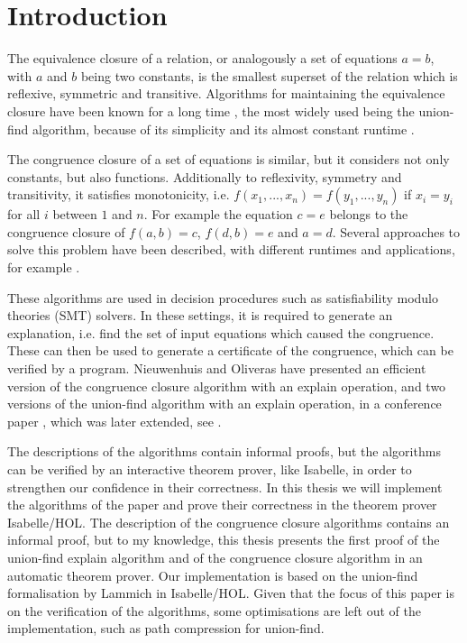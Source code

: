 
\chapter{Introduction}\label{chapter:introduction}

The equivalence closure of a relation, or analogously a set of equations $a = b$, with $a$ and $b$ being two constants, is the smallest superset of the relation which is reflexive, symmetric and transitive. Algorithms for maintaining the equivalence closure have been known for a long time \cite{unionfind-og}, the most widely used being the union-find algorithm, because of its simplicity and its almost constant runtime \cite{Tarjan}.

The congruence closure of a set of equations is similar, but it considers not only constants, but also functions. Additionally to reflexivity, symmetry and transitivity, it satisfies monotonicity, i.e. $f(x_1, ... ,x_n) = f(y_1, ... ,y_n)$ if $x_i = y_i$ for all $i$ between $1$ and $n$. \cite{Nieuwenhuis} For example the equation $c = e$ belongs to the congruence closure of $f(a,b) = c$, $f(d,b) = e$ and $a = d$. Several approaches to solve this problem have been described, with different runtimes and applications, for example \cite{congruenceclosure-og2,congruenceclosure-og,Nieuwenhuis}.

These algorithms are used in decision procedures such as satisfiability modulo theories (SMT) solvers. \cite{z3} In these settings, it is required to generate an explanation, i.e. find the set of input equations which caused the congruence. These can then be used to generate a certificate of the congruence, which can be verified by a program. Nieuwenhuis and Oliveras have presented an efficient version of the congruence closure algorithm with an explain operation, and two versions of the union-find algorithm with an explain operation, in a conference paper \cite{Nieuwenhuis}, which was later extended, see \cite{Nieuwenhuis2}.

The descriptions of the algorithms contain informal proofs, but the algorithms can be verified by an interactive theorem prover, like Isabelle, in order to strengthen our confidence in their correctness. In this thesis we will implement the algorithms of the paper \cite{Nieuwenhuis} and prove their correctness in the theorem prover Isabelle/HOL.  The description of the congruence closure algorithms contains an informal proof, but to my knowledge, this thesis presents the first proof of the union-find explain algorithm and of the congruence closure algorithm in an automatic theorem prover. Our implementation is based on the union-find formalisation by Lammich \cite{unionfind-isabelle} in Isabelle/HOL. Given that the focus of this paper is on the verification of the algorithms, some optimisations are left out of the implementation, such as path compression for union-find.


